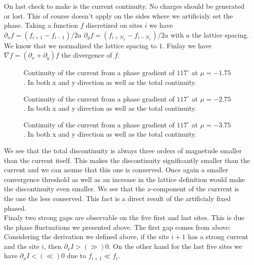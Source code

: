 \documentclass[..\main.tex]{subfile}
\begin{document}
On last check to make is the current continuity. No charges should be generated or lost. This of course doesn't apply on
the sides where we artificialy set the phase. Taking a function $f$ discretized on sites $i$ we have $\partial_x f = (f_{i+1} - f_{i-1} )/2a$
$\partial_y f = (f_{i+N_x} - f_{i-N_x} )/2a$ with
$a$ the lattice spacing. We know that we normalized the lattice spacing to $1$. Finlay we have $\nabla f = (\partial_x + \partial_y) f$ the divergence
of $f$.
\begin{figure}[H]
    
    \caption{Continuity of the current from a phase gradient of $117^{\circ}$ at $\mu = -1.75$. In both x and y direction as
    well as the total continuity.}
\end{figure}
\begin{figure}[H]
    
    \caption{Continuity of the current from a phase gradient of $117^{\circ}$ at $\mu = -2.75$. In both x and y direction as
    well as the total continuity.}
\end{figure}
\begin{figure}[H]
    
    \caption{Continuity of the current from a phase gradient of $117^{\circ}$ at $\mu = -3.75$. In both x and y direction as
    well as the total continuity.}
\end{figure}
We see that the total discontinuity is always three orders of magnetude smaller than the current itself. This makes the discontinuity
significantly smaller than the current and we can asume that this one is conserved. Once again a smaller convergence threshold
as well as an increase in the lattice definition would make the discontinuity even smaller.
We see that the $x$-component of the currrent is the one the less conserved. This fact is a direct result of the artificialy fixed phased.\\
Finaly two strong gaps are observable on the five first and last sites. This is due the phase fluctuations we presented above. The first gap
comes from above: Considering the derivation we defined above, if the site $i+1$ has a strong current and the site $i$, then $\partial_x I >(\gg)0$.
On the other hand for the last five sites we have $\partial_x I <(\ll)0$ due to $f_{i+1}\ll f_i$.
\end{document}
